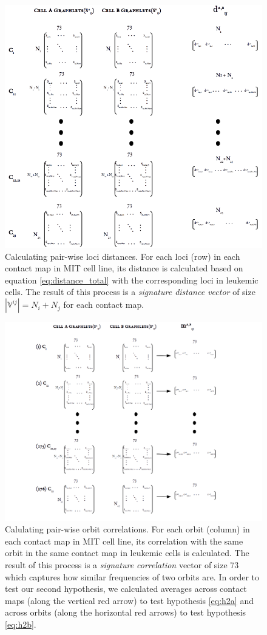 \documentclass[a4,center,fleqn]{NAR}
\begin{document}
\begin{figure}
    \centering
    \includegraphics[width=.5\textwidth]{figures/graphlet_distance_schema.png}
    \caption{Calculating pair-wise loci distances. For each loci (row) 
    in each
    contact map in MIT cell line, its distance is calculated based on
    equation \ref{eq:distance_total} with the corresponding loci in
    leukemic cells. The result of this process is a 
    \textit{signature distance vector} of size
    $|\mathbb{V}^{ij}| = N_i+N_j$ for each contact map.
    }
    \label{graphlet_distance_schema}
\end{figure}
\begin{figure}
    \centering
    \includegraphics[width=.5\textwidth]{figures/graphlet_correlation_schema.png}
    \caption{Calulating pair-wise orbit correlations. For each orbit (column)
    in each contact map in MIT cell line, its correlation with the
    same orbit in the same contact map 
    in leukemic cells is calculated. The result of
    this process is a \textit{signature correlation} vector of size
    73 which captures how similar frequencies of two orbits are.
    In order to test our second hypothesis, we calculated averages
    across contact maps (along the vertical red arrow) to test 
    hypothesis \ref{eq:h2a}
    and across orbits
    (along the horizontal red arrows) to test hypothesis \ref{eq:h2b}.}
    \label{graphlet_correlation_schema}
\end{figure}
\end{document}

